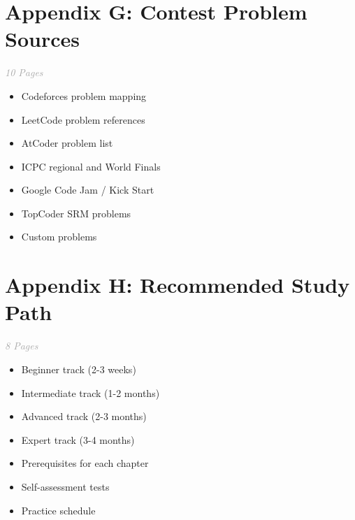 \documentclass[11pt,a4paper,oneside]{book}
\begin{document}
\section*{Appendix G: Contest Problem Sources}

\begin{tcolorbox}[
    enhanced,
    colback=white,
    colframe=primaryblue,
    boxrule=1.5pt,
    arc=3mm
]
\textit{\textcolor{darkgray}{10 Pages}}
\end{tcolorbox}

\vspace{0.3cm}

\begin{itemize}[leftmargin=*, itemsep=5pt]
    \item[\textcolor{successgreen}{$\bullet$}] Codeforces problem mapping
    \item[\textcolor{successgreen}{$\bullet$}] LeetCode problem references
    \item[\textcolor{successgreen}{$\bullet$}] AtCoder problem list
    \item[\textcolor{successgreen}{$\bullet$}] ICPC regional and World Finals
    \item[\textcolor{successgreen}{$\bullet$}] Google Code Jam / Kick Start
    \item[\textcolor{successgreen}{$\bullet$}] TopCoder SRM problems
    \item[\textcolor{successgreen}{$\bullet$}] Custom problems
\end{itemize}

\section*{Appendix H: Recommended Study Path}

\begin{tcolorbox}[
    enhanced,
    colback=white,
    colframe=primaryblue,
    boxrule=1.5pt,
    arc=3mm
]
\textit{\textcolor{darkgray}{8 Pages}}
\end{tcolorbox}

\vspace{0.3cm}

\begin{itemize}[leftmargin=*, itemsep=5pt]
    \item[\textcolor{successgreen}{$\bullet$}] Beginner track (2-3 weeks)
    \item[\textcolor{successgreen}{$\bullet$}] Intermediate track (1-2 months)
    \item[\textcolor{successgreen}{$\bullet$}] Advanced track (2-3 months)
    \item[\textcolor{successgreen}{$\bullet$}] Expert track (3-4 months)
    \item[\textcolor{successgreen}{$\bullet$}] Prerequisites for each chapter
    \item[\textcolor{successgreen}{$\bullet$}] Self-assessment tests
    \item[\textcolor{successgreen}{$\bullet$}] Practice schedule
\end{itemize}
\end{document}
